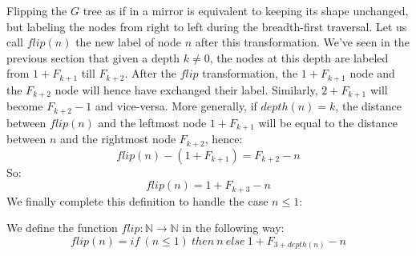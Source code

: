 \documentclass[a4paper,11pt]{article}
\begin{document}
Flipping the $G$ tree as if in a mirror is equivalent to keeping
its shape unchanged, but labeling the nodes from right to left
during the breadth-first traversal. Let us call $flip(n)$ the
new label of node $n$ after this transformation.
We've seen in the previous section that given a depth $k\neq 0$,
the nodes at this depth are labeled from $1+F_{k+1}$ till $F_{k+2}$.
After the $flip$ transformation, the $1+F_{k+1}$ node and
the $F_{k+2}$ node will hence have exchanged their label.
Similarly, $2+F_{k+1}$ will become $F_{k+2}-1$ and vice-versa.
More generally, if $depth(n)=k$, the distance between
$flip(n)$ and the leftmost node $1+F_{k+1}$ will be equal to
the distance between $n$ and the rightmost node $F_{k+2}$,
hence:
$$flip(n) - (1+F_{k+1}) = F_{k+2} - n$$
So:
$$flip(n) = 1+F_{k+3}-n$$
We finally complete this definition to handle the case $n\le 1$:
\begin{definition}
We define the function $flip : \mathbb{N}\to\mathbb{N}$
in the following way:
$$flip(n) = if~(n\le 1)~then~n~else~1+F_{3+depth(n)}-n$$
\end{definition}
\end{document}
